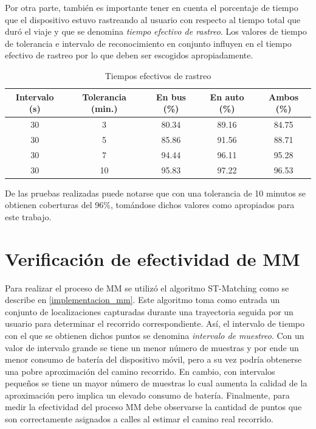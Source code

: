 Por otra parte, también es importante tener en cuenta el porcentaje de tiempo que el dispositivo estuvo rastreando al usuario con respecto al tiempo total que duró el viaje y que se denomina \emph{tiempo efectivo de rastreo}. Los valores de tiempo de tolerancia e intervalo de reconocimiento en conjunto influyen en el tiempo efectivo de rastreo por lo que deben ser escogidos apropiadamente.

\begin{table}[h]
	\centering
	\begin{tabular}{ccccc}
		\toprule
		Intervalo (s) & Tolerancia (min.) & En bus (\%) & En auto (\%) & Ambos (\%) \\
		\midrule
		30            & 3                 & 80.34         & 89.16          & 84.75        \\
		30            & 5                 & 85.86         & 91.56          & 88.71		\\
		30            & 7                & 94.44         & 96.11          & 95.28        \\
		30            & 10                & 95.83         & 97.22          & 96.53        \\
		\bottomrule
	\end{tabular}
	\caption{Tiempos efectivos de rastreo}
	\label{tab:prom_tiempo_efectivo_rastreo}
\end{table}

De las pruebas realizadas puede notarse que con una tolerancia de 10 minutos se obtienen coberturas del 96\%, tomándose dichos valores como apropiados para este trabajo.

\section{Verificación de efectividad de MM}

Para realizar el proceso de MM se utilizó el algoritmo ST-Matching como se describe en \cref{implementacion_mm}. Este algoritmo toma como entrada un conjunto de localizaciones capturadas durante una trayectoria seguida por un usuario para determinar el recorrido correspondiente. Así, el intervalo de tiempo con el que se obtienen dichos puntos se denomina \emph{intervalo de muestreo}. Con un valor de intervalo grande se tiene un menor número de muestras y por ende un menor consumo de batería del dispositivo móvil, pero a su vez podría obtenerse una pobre aproximación del camino recorrido. En cambio, con intervalos pequeños se tiene un mayor número de muestras lo cual aumenta la calidad de la aproximación pero implica un elevado consumo de batería. Finalmente, para medir la efectividad del proceso MM debe observarse la cantidad de puntos que son correctamente asignados a calles al estimar el camino real recorrido.

